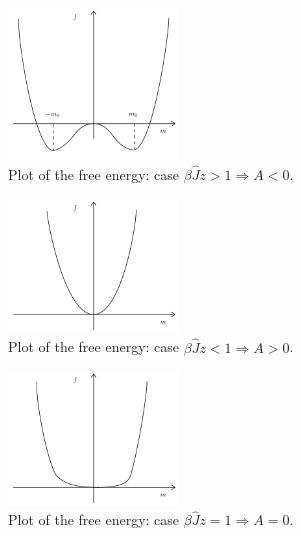 \documentclass[../main/main.tex]{subfiles}
\begin{document}
\begin{figure}[h!]
\centering
\includegraphics[width=0.4\textwidth]{../lessons/11_image/2.pdf}
\caption{\label{fig:11_2} Plot of the free energy: case \( \beta \hat{J} z > 1 \Rightarrow A<0 \).}
\end{figure} 
\begin{figure}[h!]
\centering
\includegraphics[width=0.4\textwidth]{../lessons/11_image/3.pdf}
\caption{\label{fig:11_3} Plot of the free energy: case \( \beta \hat{J} z < 1 \Rightarrow A>0 \).}
\end{figure}
\begin{figure}[h!]
\centering
\includegraphics[width=0.4\textwidth]{../lessons/11_image/4.pdf}
\caption{\label{fig:11_4} Plot of the free energy: case \( \beta \hat{J} z = 1 \Rightarrow A=0 \).}
\end{figure}
\end{document}
